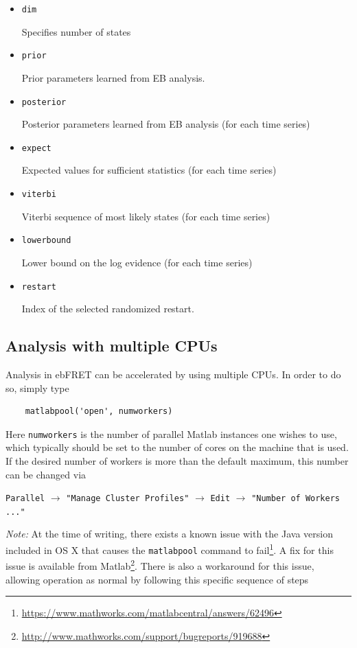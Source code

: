 \documentclass[12pt,article,oldfontcommands]{memoir}
\newcommand{\indt}{\qquad}
\begin{document}
\begin{itemize}
\item \texttt{dim}

Specifies number of states

\item \texttt{prior}

Prior parameters learned from EB analysis.

\item \texttt{posterior}

Posterior parameters learned from EB analysis (for each time series)

\item \texttt{expect}

Expected values for sufficient statistics (for each time series)

\item \texttt{viterbi}

Viterbi sequence of most likely states (for each time series)

\item \texttt{lowerbound}

Lower bound on the log evidence (for each time series)

\item \texttt{restart}

Index of the selected randomized restart.

\end{itemize}


\subsection{Analysis with multiple CPUs}

Analysis in ebFRET can be accelerated by using multiple CPUs. In order to do so, simply type 
\begin{verbatim}
    matlabpool('open', numworkers)
\end{verbatim}
Here \texttt{numworkers} is the number of parallel Matlab instances one wishes to use, which typically should be set to the number of cores on the machine that is used. If the desired number of workers is more than the default maximum, this number can be changed via

\indt\texttt{Parallel} $\to$ \texttt{"Manage Cluster Profiles"} $\to$ \texttt{Edit} $\to$ \texttt{"Number of Workers ..."}

\emph{Note:} At the time of writing, there exists a known issue with the Java version included in OS X that causes the \texttt{matlabpool} command to fail\footnote{\url{https://www.mathworks.com/matlabcentral/answers/62496}}. A fix for this issue is available from Matlab\footnote{\url{http://www.mathworks.com/support/bugreports/919688}}. There is also a workaround for this issue, allowing operation as normal by following this specific sequence of steps
\end{document}

